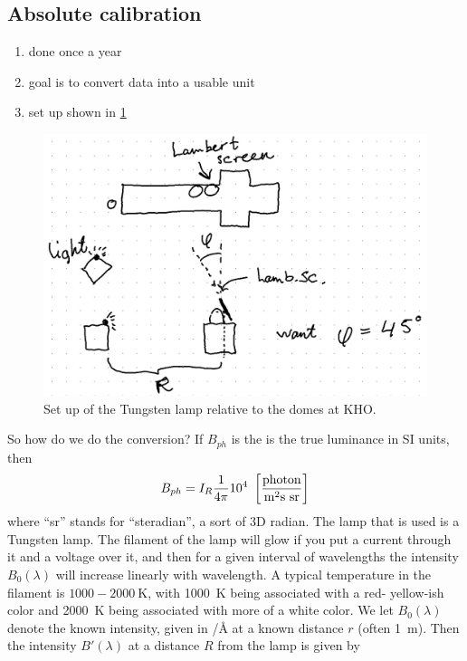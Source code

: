 \subsection{Absolute calibration}
\begin{enumerate}[\(\bullet \)]
    \item done once a year
    \item goal is to convert data into a usable unit
    \item set up shown in \cref{fig:L5_field_work_thursday}
\end{enumerate}
\begin{figure}[t]
    \centering
    \includegraphics[width=.8\linewidth]{bilder/L5_field_work_thursday.png}
    \caption{Set up of the Tungsten lamp relative to the domes at KHO.}\label{fig:L5_field_work_thursday}
\end{figure}
So how do we do the conversion? If \(B_{ph}\) is the is the true luminance in SI units, then
\begin{equation*}
    B_{ph}=I_R\frac{1}{4\pi}10^4~\left[\frac{\tn{photon}}{\si{\metre^2\second}\ \tn{sr}}\right]
\end{equation*}
where ``sr'' stands for ``steradian'', a sort of 3D radian. The lamp that is used is a Tungsten lamp. The filament of the lamp will glow if you put a current through it and a voltage over it, and then for a given interval of wavelengths the intensity \(B_0(\lambda)\) will increase linearly with wavelength. A typical temperature in the filament is \(1000-\SI{2000}{\kelvin}\), with \SI{1000}{\kelvin} being associated with a red- yellow-ish color and \SI{2000}{\kelvin} being associated with more of a white color. We let \(B_0(\lambda)\) denote the known intensity, given in \si{\ray/\angstrom} at a known distance \(r\) (often \SI{1}{\metre}). Then the intensity \(B'(\lambda)\) at a distance \(R\) from the lamp is given by
